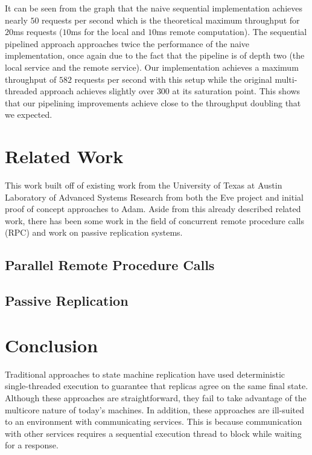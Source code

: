 \documentclass[11pt, oneside]{report}
\begin{document}
It can be seen from the graph that the naive sequential implementation achieves nearly $50$ requests per second which is the theoretical maximum throughput for $20$ms requests ($10$ms for the local and $10$ms remote computation). 
The sequential pipelined approach approaches twice the performance of the naive implementation, once again due to the fact that the pipeline is of depth two (the local service and the remote service). 
Our implementation achieves a maximum throughput of $582$ requests per second with this setup while the original multi-threaded approach achieves slightly over $300$ at its saturation point. 
This shows that our pipelining improvements achieve close to the throughput doubling that we expected.

\chapter{Related Work}\label{RelatedWork}

This work built off of existing work from the University of Texas at Austin Laboratory of Advanced Systems Research from both the Eve project and initial proof of concept approaches to Adam. Aside from this already described related work, there has been some work in the field of concurrent remote procedure calls (RPC) and work on passive replication systems.

\section{Parallel Remote Procedure Calls}

\section{Passive Replication}



\chapter{Conclusion}\label{Conclusion}

Traditional approaches to state machine replication have used deterministic single-threaded execution to guarantee that replicas agree on the same final state. Although these approaches are straightforward, they fail to take advantage of the multicore nature of today's machines. 
In addition, these approaches are ill-suited to an environment with communicating services. This is because communication with other services requires a sequential execution thread to block while waiting for a response. 
\end{document}
